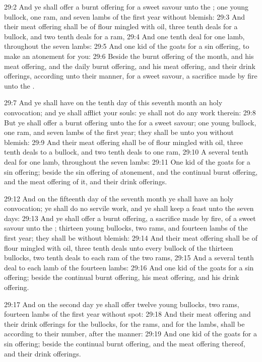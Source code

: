 29:2 And ye shall offer a burnt offering for a sweet savour unto the
\LORD; one young bullock, one ram, and seven lambs of the first year
without blemish: 29:3 And their meat offering shall be of flour
mingled with oil, three tenth deals for a bullock, and two tenth deals
for a ram, 29:4 And one tenth deal for one lamb, throughout the seven
lambs: 29:5 And one kid of the goats for a sin offering, to make an
atonement for you: 29:6 Beside the burnt offering of the month, and
his meat offering, and the daily burnt offering, and his meat
offering, and their drink offerings, according unto their manner, for
a sweet savour, a sacrifice made by fire unto the \LORD.

29:7 And ye shall have on the tenth day of this seventh month an holy
convocation; and ye shall afflict your souls: ye shall not do any work
therein: 29:8 But ye shall offer a burnt offering unto the \LORD for a
sweet savour; one young bullock, one ram, and seven lambs of the first
year; they shall be unto you without blemish: 29:9 And their meat
offering shall be of flour mingled with oil, three tenth deals to a
bullock, and two tenth deals to one ram, 29:10 A several tenth deal
for one lamb, throughout the seven lambs: 29:11 One kid of the goats
for a sin offering; beside the sin offering of atonement, and the
continual burnt offering, and the meat offering of it, and their drink
offerings.

29:12 And on the fifteenth day of the seventh month ye shall have an
holy convocation; ye shall do no servile work, and ye shall keep a
feast unto the \LORD seven days: 29:13 And ye shall offer a burnt
offering, a sacrifice made by fire, of a sweet savour unto the \LORD;
thirteen young bullocks, two rams, and fourteen lambs of the first
year; they shall be without blemish: 29:14 And their meat offering
shall be of flour mingled with oil, three tenth deals unto every
bullock of the thirteen bullocks, two tenth deals to each ram of the
two rams, 29:15 And a several tenth deal to each lamb of the fourteen
lambs: 29:16 And one kid of the goats for a sin offering; beside the
continual burnt offering, his meat offering, and his drink offering.

29:17 And on the second day ye shall offer twelve young bullocks, two
rams, fourteen lambs of the first year without spot: 29:18 And their
meat offering and their drink offerings for the bullocks, for the
rams, and for the lambs, shall be according to their number, after the
manner: 29:19 And one kid of the goats for a sin offering; beside the
continual burnt offering, and the meat offering thereof, and their
drink offerings.

